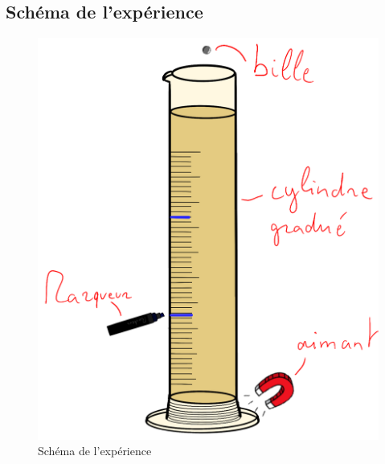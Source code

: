 \subsection{Schéma de l'expérience}\label{subsec:schema}
\begin{figure}[H]
    \centering
    \includegraphics[scale=0.45]{graph/schema-exp}
    \caption{Schéma de l'expérience}
    \label{fig:schema-exp}
\end{figure}